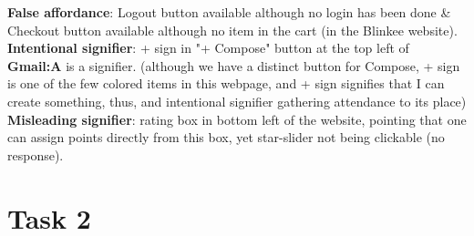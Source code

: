 \documentclass[a4paper,11pt,oneside]{scrreprt}
\begin{document}
\textbf{False affordance}: Logout button available although no login has been done \& Checkout button available although no item in the cart (in the Blinkee website).\\



\textbf{Intentional signifier}: + sign in "+ Compose" button at the top left of  \textbf{Gmail:A} is a signifier. (although we have a distinct button for Compose, + sign is one of the few colored items in this webpage, and + sign signifies that I can create something, thus, and intentional signifier gathering attendance to its place)\\

\textbf{Misleading signifier}: rating box in bottom left of the website, pointing that one can assign points directly from this box, yet star-slider not being clickable (no response). 


\clearpage

\section*{Task 2}
\end{document}
